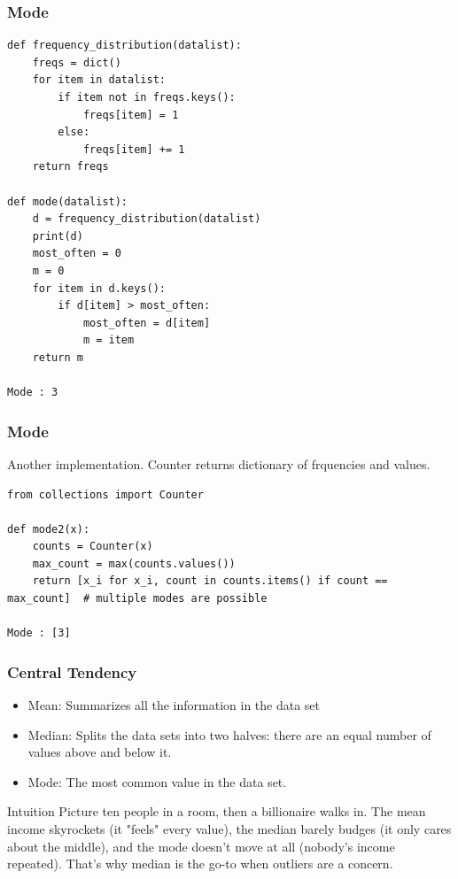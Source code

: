 \begin{frame}[fragile]\frametitle{Mode}
\begin{lstlisting}
def frequency_distribution(datalist):
	freqs = dict()
	for item in datalist:
		if item not in freqs.keys():
			freqs[item] = 1
		else:
			freqs[item] += 1
	return freqs

def mode(datalist):
    d = frequency_distribution(datalist)
    print(d)
    most_often = 0
    m = 0
    for item in d.keys():
        if d[item] > most_often:
            most_often = d[item]
            m = item
    return m

Mode : 3
\end{lstlisting}
\end{frame}

\begin{frame}[fragile]\frametitle{Mode}
Another implementation. Counter returns dictionary of frquencies and values.
\begin{lstlisting}
from collections import Counter

def mode2(x):
    counts = Counter(x)
    max_count = max(counts.values())
    return [x_i for x_i, count in counts.items() if count == max_count]  # multiple modes are possible

Mode : [3]
\end{lstlisting}
\end{frame}



\begin{frame}[fragile]\frametitle{Central Tendency}	

\begin{itemize}
\item Mean: Summarizes all the information in the data set
\item Median: Splits the data sets into two halves: there are an equal number of values above and below it.
\item Mode: The most common value in the data set.
\end{itemize}

\begin{block}{Intuition}
Picture ten people in a room, then a billionaire walks in. The mean income skyrockets (it "feels" every value), the median barely budges (it only cares about the middle), and the mode doesn't move at all (nobody's income repeated). That's why median is the go-to when outliers are a concern.
\end{block}


\end{frame}

